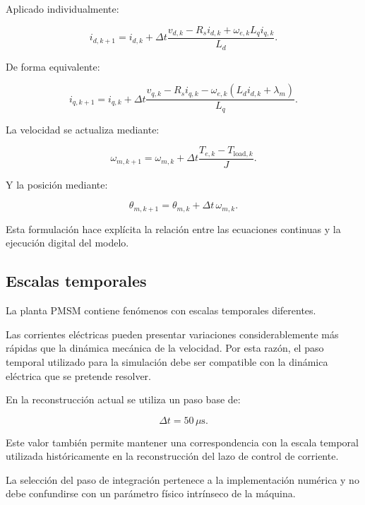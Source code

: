 Aplicado individualmente:

\begin{equation}
i_{d,k+1}
=
i_{d,k}
+
\Delta t
\frac{
v_{d,k}-R_si_{d,k}
+\omega_{e,k}L_qi_{q,k}
}{
L_d
}.
\end{equation}

De forma equivalente:

\begin{equation}
i_{q,k+1}
=
i_{q,k}
+
\Delta t
\frac{
v_{q,k}-R_si_{q,k}
-\omega_{e,k}
(L_di_{d,k}+\lambda_m)
}{
L_q
}.
\end{equation}

La velocidad se actualiza mediante:

\begin{equation}
\omega_{m,k+1}
=
\omega_{m,k}
+
\Delta t
\frac{
T_{e,k}-T_{\mathrm{load},k}
}{
J
}.
\end{equation}

Y la posición mediante:

\begin{equation}
\theta_{m,k+1}
=
\theta_{m,k}
+
\Delta t\,\omega_{m,k}.
\end{equation}

Esta formulación hace explícita la relación entre las ecuaciones continuas y la ejecución digital del modelo.

\subsection{Escalas temporales}

La planta PMSM contiene fenómenos con escalas temporales diferentes.

Las corrientes eléctricas pueden presentar variaciones considerablemente más rápidas que la dinámica mecánica de la velocidad. Por esta razón, el paso temporal utilizado para la simulación debe ser compatible con la dinámica eléctrica que se pretende resolver.

En la reconstrucción actual se utiliza un paso base de:

\begin{equation}
\Delta t=50\,\mu\mathrm{s}.
\end{equation}

Este valor también permite mantener una correspondencia con la escala temporal utilizada históricamente en la reconstrucción del lazo de control de corriente.

La selección del paso de integración pertenece a la implementación numérica y no debe confundirse con un parámetro físico intrínseco de la máquina.


